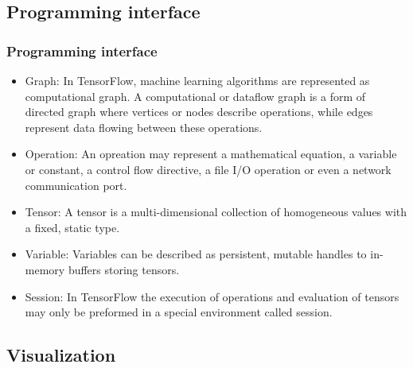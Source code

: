 \subsection{Programming interface}

\begin{frame}
  \MyLogo
  \frametitle{Programming interface}
  \begin{itemize}
	  	\item Graph: In TensorFlow, machine learning algorithms are represented as computational graph. A computational or dataflow graph is a form of directed graph where vertices or nodes describe operations, while edges represent data flowing between these operations.
	  	
	  	\item Operation: An opreation may represent a mathematical equation, a variable or constant, a control flow directive, a file I/O operation or even a network communication port.
	  	
	  	\item Tensor: A tensor is a multi-dimensional collection of homogeneous values with a fixed, static type.
	  	
	  	\item Variable: Variables can be described as persistent, mutable handles to in-memory buffers storing tensors.
	  	
	  	\item Session: In TensorFlow the execution of operations and evaluation of tensors may only be preformed in a special environment called session.
  \end{itemize}

\end{frame}

\subsection{Visualization}

